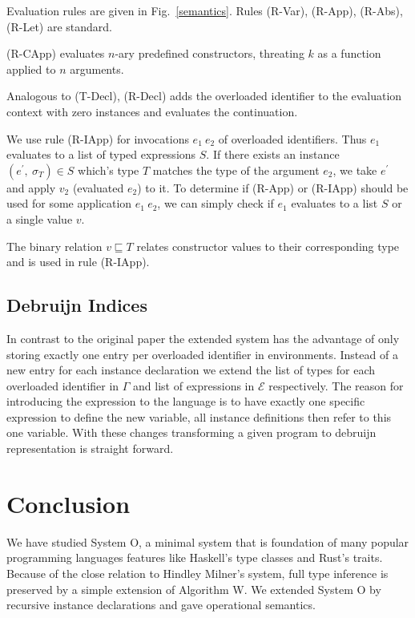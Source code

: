 \documentclass[runningheads]{llncs}
\newcommand{\snip}[1]{\footnotesize{\ttfamily{#1}}}
\begin{document}
\noindent Evaluation rules are given in Fig.~\ref{semantics}. Rules (R-Var), (R-App), (R-Abs), (R-Let) are standard. 

(R-CApp) evaluates $n$-ary predefined constructors, threating $k$ as a function applied to $n$ arguments. 

Analogous to (T-Decl), (R-Decl) adds the overloaded identifier to the evaluation context with zero instances and evaluates the continuation.

We use rule (R-IApp) for invocations $e_1 \ e_2$ of overloaded identifiers.
Thus $e_1$ evaluates to a list of typed expressions $S$. 
If there exists an instance $(e^\prime, \ \sigma_T) \in S$ which's type $T$ matches the type of the argument $e_2$, we take $e^\prime$ and apply $v_2$ (evaluated $e_2$) to it.
To determine if (R-App) or (R-IApp) should be used for some application $e_1 \ e_2$, we can simply check if $e_1$ evaluates to a list $S$ or a single value $v$. 

The binary relation $v \sqsubseteq T$ relates constructor values to their corresponding type and is used in rule (R-IApp).

\subsection{Debruijn Indices}
In contrast to the original paper the extended system has the advantage of only storing exactly one entry per overloaded identifier in environments. 
Instead of a new entry for each instance declaration we extend the list of types for each overloaded identifier in $\Gamma$ and list of expressions in $\mathcal{E}$ respectively.
The reason for introducing the \snip{decl} expression to the language is to have exactly one specific expression to define the new variable, all instance definitions then refer to this one variable. 
With these changes transforming a given program to debruijn representation is straight forward.

\section{Conclusion}
We have studied System O, a minimal system that is foundation of many popular programming languages features like Haskell's type classes and Rust's traits. 
Because of the close relation to Hindley Milner's system, full type inference is preserved by a simple extension of Algorithm W. 
We extended System O by recursive instance declarations and gave operational semantics.
\end{document}
